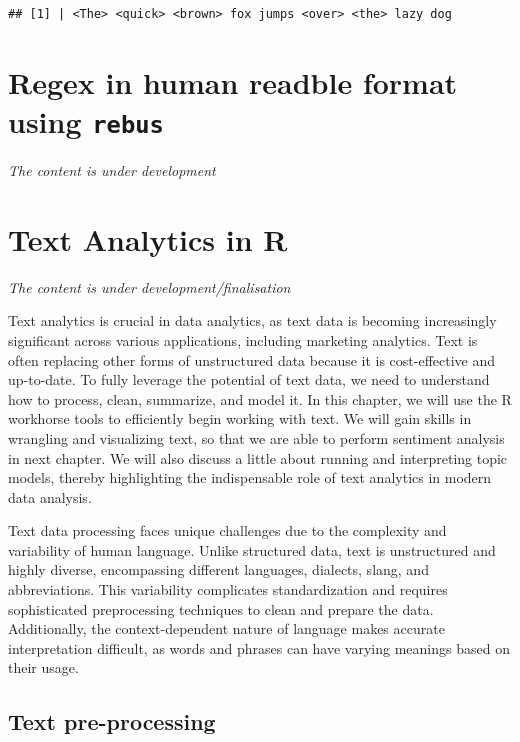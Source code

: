 \documentclass[
]{book}
\begin{document}
\begin{verbatim}
## [1] | <The> <quick> <brown> fox jumps <over> <the> lazy dog
\end{verbatim}

\hypertarget{regex-in-human-readble-format-using-rebus}{%
\chapter{\texorpdfstring{Regex in human readble format using \texttt{rebus}}{Regex in human readble format using rebus}}\label{regex-in-human-readble-format-using-rebus}}

\emph{The content is under development}

\hypertarget{text-analytics-in-r}{%
\chapter{Text Analytics in R}\label{text-analytics-in-r}}

\emph{The content is under development/finalisation}

Text analytics is crucial in data analytics, as text data is becoming increasingly significant across various applications, including marketing analytics. Text is often replacing other forms of unstructured data because it is cost-effective and up-to-date. To fully leverage the potential of text data, we need to understand how to process, clean, summarize, and model it. In this chapter, we will use the R workhorse tools to efficiently begin working with text. We will gain skills in wrangling and visualizing text, so that we are able to perform sentiment analysis in next chapter. We will also discuss a little about running and interpreting topic models, thereby highlighting the indispensable role of text analytics in modern data analysis.

Text data processing faces unique challenges due to the complexity and variability of human language. Unlike structured data, text is unstructured and highly diverse, encompassing different languages, dialects, slang, and abbreviations. This variability complicates standardization and requires sophisticated preprocessing techniques to clean and prepare the data. Additionally, the context-dependent nature of language makes accurate interpretation difficult, as words and phrases can have varying meanings based on their usage.

\hypertarget{text-pre-processing}{%
\section*{Text pre-processing}\label{text-pre-processing}}
\end{document}
